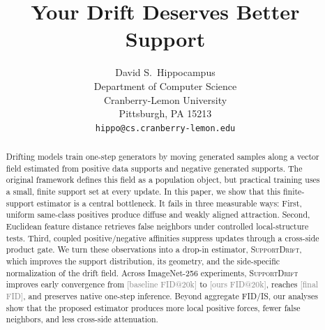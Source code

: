 \documentclass{article}
\title{Your Drift Deserves Better Support}
\author{%
  David S.~Hippocampus \\
  Department of Computer Science\\
  Cranberry-Lemon University\\
  Pittsburgh, PA 15213 \\
  \texttt{hippo@cs.cranberry-lemon.edu} \\
}
\newcommand{\model}{\textsc{SupportDrift}\xspace}
\newcommand{\todoresult}[1]{\textcolor{gray}{[#1]}}
\begin{document}
\maketitle



\begin{abstract}
Drifting models train one-step generators by moving generated samples along a vector field estimated from positive data supports and negative generated supports.
The original framework defines this field as a population object, but practical training uses a small, finite support set at every update.
In this paper, we show that this finite-support estimator is a central bottleneck.
It fails in three measurable ways: First, uniform same-class positives produce diffuse and weakly aligned attraction. Second, Euclidean feature distance retrieves false neighbors under controlled local-structure tests. Third, coupled positive/negative affinities suppress updates through a cross-side product gate.
We turn these observations into a drop-in estimator, \model, which improves the support distribution, its geometry, and the side-specific normalization of the drift field.
Across ImageNet-256 experiments, \model improves early convergence from \todoresult{baseline FID@20k} to \todoresult{ours FID@20k}, reaches \todoresult{final FID}, and preserves native one-step inference.
Beyond aggregate FID/IS, our analyses show that the proposed estimator produces more local positive forces, fewer false neighbors, and less cross-side attenuation.

\end{abstract}
\end{document}
